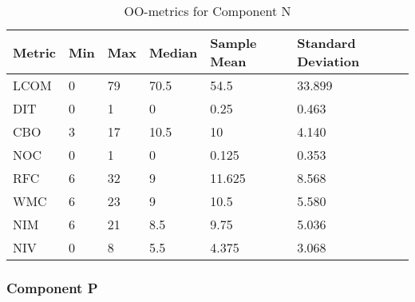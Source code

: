 \begin{table}[]
\centering
\caption{OO-metrics for Component N}
\label{tab:oometrics-netw}
\begin{tabular}{|l|l|l|l|l|l|}
\hline
\textbf{Metric} & \textbf{Min} & \textbf{Max} & \textbf{Median} & \textbf{Sample Mean} & \textbf{Standard Deviation} \\ \hline
LCOM            & 0            & 79           & 70.5            & 54.5                 & 33.899                      \\ \hline
DIT             & 0            & 1            & 0               & 0.25                 & 0.463                       \\ \hline
CBO             & 3            & 17           & 10.5            & 10                   & 4.140                       \\ \hline
NOC             & 0            & 1            & 0               & 0.125                & 0.353                       \\ \hline
RFC             & 6            & 32           & 9               & 11.625               & 8.568                       \\ \hline
WMC             & 6            & 23           & 9               & 10.5                 & 5.580                       \\ \hline
NIM             & 6            & 21           & 8.5             & 9.75                 & 5.036                       \\ \hline
NIV             & 0            & 8            & 5.5             & 4.375                & 3.068                       \\ \hline
\end{tabular}
\end{table}




\subsubsection{Component P}

